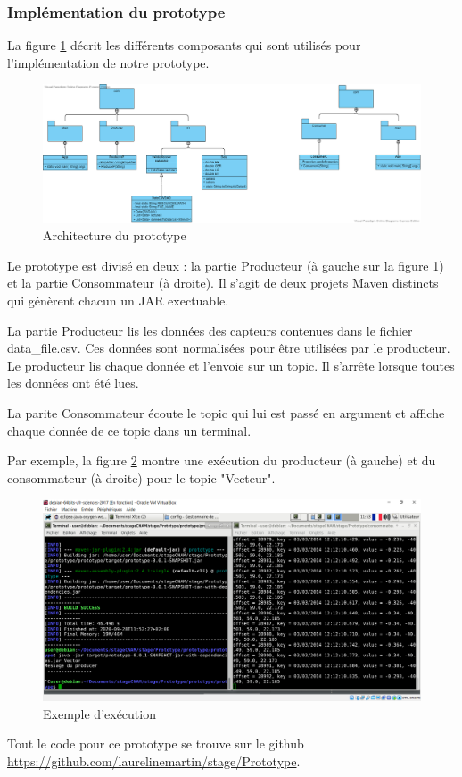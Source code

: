 \documentclass{article}
\begin{document}
		\subsubsection{Implémentation du prototype}
			La figure \ref{fig:archiimp} décrit les différents composants qui sont utilisés pour l'implémentation de notre prototype.\par
			\begin{figure}
				\includegraphics[scale=0.5]{../include/Diagramme_prototype.png}
				\caption{Architecture du prototype}
				\label{fig:archiimp}
			\end{figure}
			Le prototype est divisé en deux :
			la partie Producteur (à gauche sur la figure \ref{fig:archiimp}) et la partie Consommateur (à droite).
			Il s'agit de deux projets Maven distincts qui génèrent chacun un JAR exectuable.\par
			La partie Producteur lis les données des capteurs contenues dans le fichier data\_file.csv.
			Ces données sont normalisées pour être utilisées par le producteur.
			Le producteur lis chaque donnée et l'envoie sur un topic.
			Il s'arrête lorsque toutes les données ont été lues.\par
			La parite Consommateur écoute le topic qui lui est passé en argument et affiche chaque donnée de ce topic dans un terminal.\par
			Par exemple, la figure \ref{fig:exemple} montre une exécution du producteur (à gauche) et du consommateur (à droite) pour le topic "Vecteur".
			\begin{figure}
				\includegraphics[scale=0.5]{../include/producteurConsommateur.PNG}
				\caption{Exemple d'exécution}
				\label{fig:exemple}
			\end{figure}\par
			Tout le code pour ce prototype se trouve sur le github \href{https://github.com/laurelinemartin/stage/Prototype}{https://github.com/laurelinemartin/stage/Prototype}.
\end{document}
